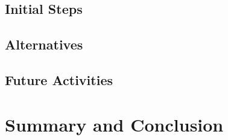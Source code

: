 \documentclass[english,twocolumn,smartquotes]{hgbarticle}
\begin{document}
\subsection{Initial Steps}

\lipsum[5-7]

\subsection{Alternatives}

\lipsum[5-7]

\subsection{Future Activities}

\lipsum[5-7]


\section{Summary and Conclusion}

\lipsum[8-9]

\printbibliography %

\end{document}
